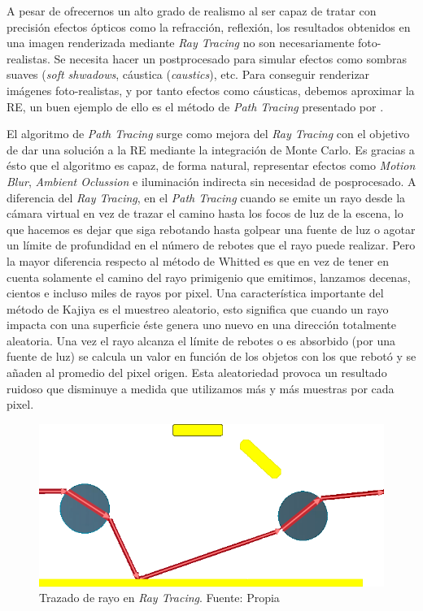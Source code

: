 \documentclass[titlepage,12pt]{report}
\begin{document}
A pesar de ofrecernos un alto grado de realismo al ser capaz de tratar con precisión efectos ópticos como la refracción, reflexión, los resultados obtenidos en una imagen renderizada mediante \textit{Ray Tracing} no son necesariamente foto-realistas. Se necesita hacer un postprocesado para simular efectos como sombras suaves (\textit{soft shwadows}, cáustica (\textit{caustics}), etc. Para conseguir renderizar imágenes foto-realistas, y por tanto efectos como cáusticas, debemos aproximar la RE, un buen ejemplo de ello es el método de \textit{Path Tracing} presentado por \citep{Kajiya1986}.

El algoritmo de \textit{Path Tracing} surge como mejora del \textit{Ray Tracing} con el objetivo de dar una solución a la RE mediante la integración de Monte Carlo. Es gracias a ésto que el algoritmo es capaz, de forma natural, representar efectos como \textit{Motion Blur}, \textit{Ambient Oclussion} e iluminación indirecta sin necesidad de posprocesado. A diferencia del \textit{Ray Tracing}, en el \textit{Path Tracing} cuando se emite un rayo desde la cámara virtual en vez de trazar el camino hasta los focos de luz de la escena, lo que hacemos es dejar que siga rebotando hasta golpear una fuente de luz o agotar un límite de profundidad en el número de rebotes que el rayo puede realizar. Pero la mayor diferencia respecto al método de Whitted es que en vez de tener en cuenta solamente el camino del rayo primigenio que emitimos, lanzamos decenas, cientos e incluso miles de rayos por pixel. Una característica importante del método de Kajiya es el muestreo aleatorio, esto significa que cuando un rayo impacta con una superficie éste genera uno nuevo en una dirección totalmente aleatoria. Una vez el rayo alcanza el límite de rebotes o es absorbido (por una fuente de luz) se calcula un valor en función de los objetos con los que rebotó y se añaden al promedio del pixel origen. Esta aleatoriedad provoca un resultado ruidoso que disminuye a medida que utilizamos más y más muestras por cada pixel.

\begin{figure}[!ht]
	\centering
	\includegraphics[scale=0.45]{media/lightPathRT.png}
	\caption{Trazado de rayo en \textit{Ray Tracing}. Fuente: Propia}
	\label{RT_traced}
\end{figure}
\end{document}

